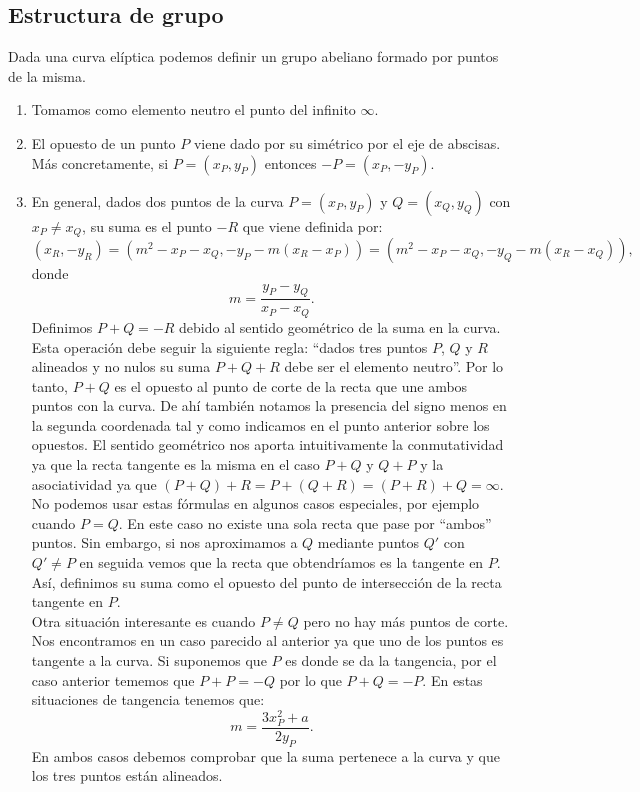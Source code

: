 \documentclass[11pt]{article}
\begin{document}
\subsection{Estructura de grupo}
Dada una curva elíptica podemos definir un grupo abeliano formado por puntos de la misma. 
\begin{enumerate}
\item Tomamos como elemento neutro el punto del infinito $\infty$.
\item El opuesto de un punto $ P $ viene dado por su simétrico por el eje de abscisas. Más concretamente, si $ P = (x_P, y_P) $ entonces $ -P = (x_P, -y_P) $.
\item En general, dados dos puntos de la curva $ P = (x_P, y_P) $ y $ Q = (x_Q, y_Q) $ con $ x_P \neq x_Q $, su suma es el punto $ -R $ que viene definida por:
\[
(x_R, -y_R) =(m^2 − x_P − x_Q, -y_P - m(x_R − x_P )) = (m^2 − x_P − x_Q, -y_Q - m(x_R − x_Q )),
\]
donde
\[
m = \frac{y_P-y_Q}{x_P-x_Q}.
\]
Definimos $ P+Q=-R $ debido al sentido geométrico de la suma en la curva. Esta operación debe seguir la siguiente regla: ``dados tres puntos $ P$, $ Q $ y $ R $ alineados y no nulos su suma $ P + Q + R $ debe ser el elemento neutro''. Por lo tanto, $ P +Q $ es el opuesto al punto de corte de la recta que une ambos puntos con la curva. De ahí también notamos la presencia del signo menos en la segunda coordenada tal y como indicamos en el punto anterior sobre los opuestos. El sentido geométrico nos aporta intuitivamente la conmutatividad ya que la recta tangente es la misma en el caso $ P+Q $ y $ Q+P $ y la asociatividad ya que $ (P+Q) + R = P + (Q+R) = (P+R) + Q = \infty$.\\

No podemos usar estas fórmulas en algunos casos especiales, por ejemplo cuando $ P=Q $. En este caso no existe una sola recta que pase por ``ambos'' puntos. Sin embargo, si nos aproximamos a $ Q $ mediante puntos $ Q' $ con $ Q' \neq P $ en seguida vemos que la recta que obtendríamos es la tangente en $ P $. Así, definimos su suma como el opuesto del punto de intersección de la recta tangente en $ P $.\\

Otra situación interesante es cuando $ P \neq Q $ pero no hay más puntos de corte. Nos encontramos en un caso parecido al anterior ya que uno de los puntos es tangente a la curva. Si suponemos que $ P $ es donde se da la tangencia, por el caso anterior tememos que $ P + P = -Q $ por lo que $ P + Q = -P $. En estas situaciones de tangencia tenemos que:
\[
m = \frac{3x^{2}_P + a}{2y_P}.
\]
En ambos casos debemos comprobar que la suma pertenece a la curva y que los tres puntos están alineados.


\end{enumerate}
\end{document}
